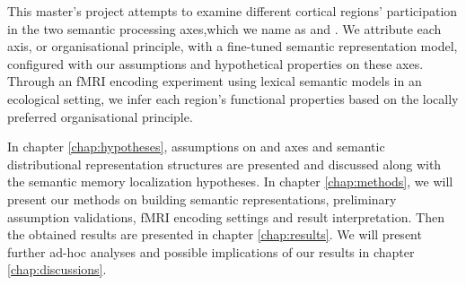 This master's project attempts to examine different cortical regions' participation in the two semantic processing axes,which we name as \similarity and \association. We attribute each axis, or organisational principle, with a fine-tuned semantic representation model, configured with our assumptions and hypothetical properties on these axes. 
Through an fMRI encoding experiment using lexical semantic models in an ecological setting, we infer each region's functional properties based on the locally preferred organisational principle.

In chapter \ref{chap:hypotheses}, assumptions on \similarity and \association axes and semantic distributional representation structures are presented and discussed along with the semantic memory localization hypotheses. In chapter \ref{chap:methods}, we will present our methods on building semantic representations, preliminary assumption validations, fMRI encoding settings and result interpretation. Then the obtained results are presented in chapter \ref{chap:results}. We will present further ad-hoc analyses and possible implications of our results in chapter \ref{chap:discussions}.